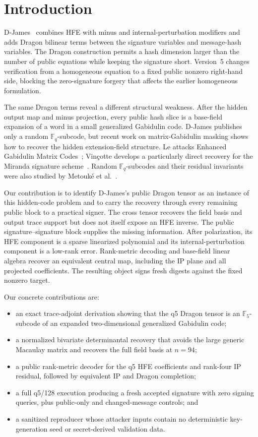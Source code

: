 \documentclass[10pt,a4paper]{article}
\newcommand{\F}{\mathbb{F}}
\begin{document}
\section{Introduction}

D-James~\cite{djames} combines HFE with minus and internal-perturbation
modifiers and adds Dragon bilinear terms between the signature variables and
message-hash variables.  The Dragon construction permits a hash dimension
larger than the number of public equations while keeping the signature short.
Version~5 changes verification from a homogeneous equation to a fixed public
nonzero right-hand side, blocking the zero-signature forgery that affects the
earlier homogeneous formulation.

The same Dragon terms reveal a different structural weakness.  After the
hidden output map and minus projection, every public hash slice is a base-field
expansion of a word in a small generalized Gabidulin code.  D-James publishes
only a random $\F_q$-subcode, but recent work on matrix-Gabidulin masking shows
how to recover the hidden extension-field structure.  Le attacks Enhanced
Gabidulin Matrix Codes~\cite{le}; Vin\c{c}otte develops a particularly direct
recovery for the Miranda signature scheme~\cite{vincotte}.  Random
$\F_q$-subcodes and their residual invariants were also studied by Metouk\'e
et al.~\cite{metouke}.

Our contribution is to identify D-James's public Dragon tensor as an instance
of this hidden-code problem and to carry the recovery through every remaining
public block to a practical signer.  The cross tensor recovers the field basis
and output trace support but does not itself expose an HFE inverse.  The public
signature--signature block supplies the missing information.  After
polarization, its HFE component is a sparse linearized polynomial and its
internal-perturbation component is a low-rank error.  Rank-metric decoding and
base-field linear algebra recover an equivalent central map, including the IP
plane and all projected coefficients.  The resulting object signs fresh
digests against the fixed nonzero target.

Our concrete contributions are:
\begin{itemize}
  \item an exact trace-adjoint derivation showing that the q5 Dragon tensor is
  an $\F_5$-subcode of an expanded two-dimensional generalized Gabidulin code;
  \item a normalized bivariate determinantal recovery that avoids the large
  generic Macaulay matrix and recovers the full field basis at $n=94$;
  \item a public rank-metric decoder for the q5 HFE coefficients and
  rank-four IP residual, followed by equivalent IP and Dragon completion;
  \item a full q5/128 execution producing a fresh accepted signature with zero
  signing queries, plus public-only and changed-message controls; and
  \item a sanitized reproducer whose attacker inputs contain no deterministic
  key-generation seed or secret-derived validation data.
\end{itemize}
\end{document}
